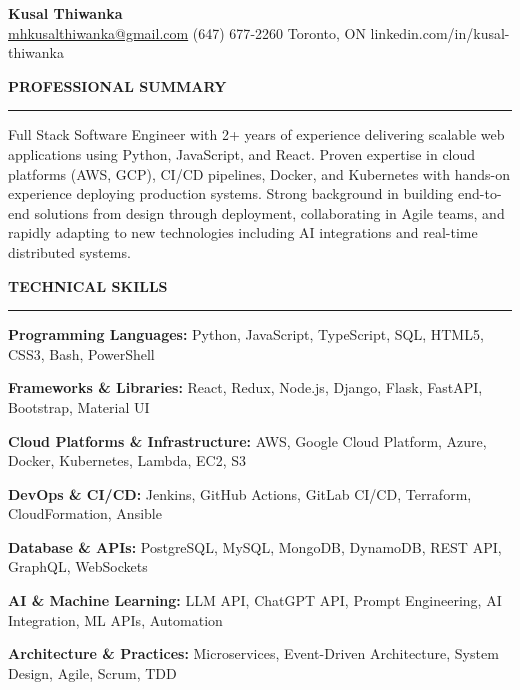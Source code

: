 \documentclass[10pt,letterpaper]{article}
\begin{document}
\begin{center}
{\LARGE\textbf{Kusal Thiwanka}}\\[3pt]
\href{mailto:mhkusalthiwanka@gmail.com}{mhkusalthiwanka@gmail.com}\hspace{2em}%
(647) 677{-}2260\hspace{2em}%
Toronto, ON\hspace{2em}
linkedin.com/in/kusal-thiwanka
\end{center}

\vspace{6pt}

\textbf{PROFESSIONAL SUMMARY}\\[-8pt]
\noindent\rule{\textwidth}{1pt}

\vspace{-2pt}

Full Stack Software Engineer with 2+ years of experience delivering scalable web applications using Python, JavaScript, and React. Proven expertise in cloud platforms (AWS, GCP), CI/CD pipelines, Docker, and Kubernetes with hands-on experience deploying production systems. Strong background in building end-to-end solutions from design through deployment, collaborating in Agile teams, and rapidly adapting to new technologies including AI integrations and real-time distributed systems.

\vspace{8pt}

\textbf{TECHNICAL SKILLS}\\[-8pt]
\noindent\rule{\textwidth}{1pt}

\vspace{-2pt}

\textbf{Programming Languages:} Python, JavaScript, TypeScript, SQL, HTML5, CSS3, Bash, PowerShell

\textbf{Frameworks \& Libraries:} React, Redux, Node.js, Django, Flask, FastAPI, Bootstrap, Material UI

\textbf{Cloud Platforms \& Infrastructure:} AWS, Google Cloud Platform, Azure, Docker, Kubernetes, Lambda, EC2, S3

\textbf{DevOps \& CI/CD:} Jenkins, GitHub Actions, GitLab CI/CD, Terraform, CloudFormation, Ansible

\textbf{Database \& APIs:} PostgreSQL, MySQL, MongoDB, DynamoDB, REST API, GraphQL, WebSockets

\textbf{AI \& Machine Learning:} LLM API, ChatGPT API, Prompt Engineering, AI Integration, ML APIs, Automation

\textbf{Architecture \& Practices:} Microservices, Event-Driven Architecture, System Design, Agile, Scrum, TDD
\end{document}
